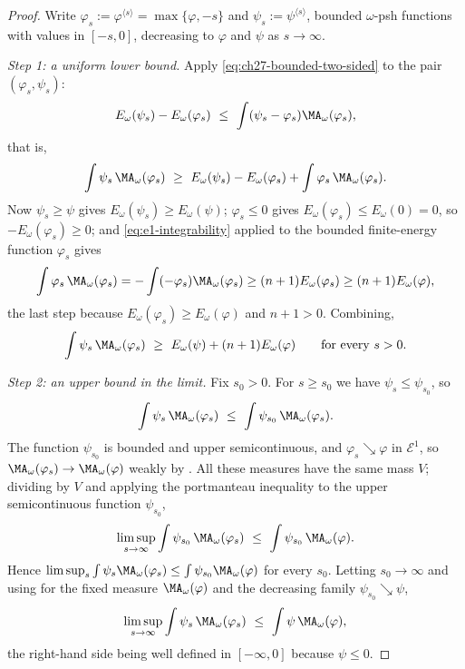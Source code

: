 \begin{proof}
Write \(\varphi_s:=\varphi^{\langle s\rangle}=\max\{\varphi,-s\}\) and
\(\psi_s:=\psi^{\langle s\rangle}\), bounded \(\omega\)-psh functions with
values in \([-s,0]\), decreasing to \(\varphi\) and \(\psi\) as
\(s\to\infty\).

\emph{Step 1: a uniform lower bound.}
Apply \eqref{eq:ch27-bounded-two-sided} to the pair
\((\varphi_s,\psi_s)\):
\[
 E_\omega(\psi_s)-E_\omega(\varphi_s)
 \ \leq\ \int(\psi_s-\varphi_s)\MA_\omega(\varphi_s),
\]
that is,
\[
 \int\psi_s\,\MA_\omega(\varphi_s)
 \ \geq\ E_\omega(\psi_s)-E_\omega(\varphi_s)
        +\int\varphi_s\,\MA_\omega(\varphi_s).
\]
Now \(\psi_s\geq\psi\) gives \(E_\omega(\psi_s)\geq E_\omega(\psi)\);
\(\varphi_s\leq0\) gives \(E_\omega(\varphi_s)\leq E_\omega(0)=0\), so
\(-E_\omega(\varphi_s)\geq0\); and
\eqref{eq:e1-integrability} applied to the bounded finite-energy function
\(\varphi_s\) gives
\[
 \int\varphi_s\,\MA_\omega(\varphi_s)
 =-\int(-\varphi_s)\MA_\omega(\varphi_s)
 \geq(n+1)E_\omega(\varphi_s)\geq(n+1)E_\omega(\varphi),
\]
the last step because \(E_\omega(\varphi_s)\geq E_\omega(\varphi)\) and
\(n+1>0\).  Combining,
\begin{equation}\label{eq:ch27-uniform-lower-bound}
 \int\psi_s\,\MA_\omega(\varphi_s)
 \ \geq\ E_\omega(\psi)+(n+1)E_\omega(\varphi)
 \qquad\text{for every }s>0 .
\end{equation}

\emph{Step 2: an upper bound in the limit.}
Fix \(s_0>0\).  For \(s\geq s_0\) we have \(\psi_s\leq\psi_{s_0}\), so
\[
 \int\psi_s\,\MA_\omega(\varphi_s)
 \ \leq\ \int\psi_{s_0}\,\MA_\omega(\varphi_s).
\]
The function \(\psi_{s_0}\) is bounded and upper semicontinuous, and
\(\varphi_s\searrow\varphi\) in \(\mathcal E^1\), so
\(\MA_\omega(\varphi_s)\to\MA_\omega(\varphi)\) weakly by
.  All these measures have the same mass
\(V\); dividing by \(V\) and applying the portmanteau inequality
 to the upper semicontinuous function
\(\psi_{s_0}\),
\[
 \limsup_{s\to\infty}\int\psi_{s_0}\,\MA_\omega(\varphi_s)
 \ \leq\ \int\psi_{s_0}\,\MA_\omega(\varphi).
\]
Hence
\(\limsup_s\int\psi_s\MA_\omega(\varphi_s)
 \leq\int\psi_{s_0}\MA_\omega(\varphi)\) for every \(s_0\).  Letting
\(s_0\to\infty\) and using  for the
fixed measure \(\MA_\omega(\varphi)\) and the decreasing family
\(\psi_{s_0}\searrow\psi\),
\begin{equation}\label{eq:ch27-upper-limsup}
 \limsup_{s\to\infty}\int\psi_s\,\MA_\omega(\varphi_s)
 \ \leq\ \int\psi\,\MA_\omega(\varphi),
\end{equation}
the right-hand side being well defined in \([-\infty,0]\) because
\(\psi\leq0\).


\end{proof}
